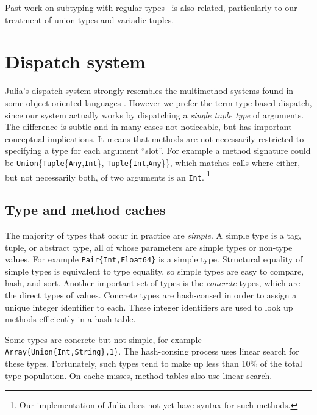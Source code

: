 Past work on subtyping with regular
types~\cite{hosoya2000regular, xtatic} is also related, particularly
to our treatment of union types and variadic tuples.


\section{Dispatch system}


Julia's dispatch system strongly resembles the multimethod systems
found in some object-oriented languages
\cite{closspec,closoverview,dylanlang,cecil,cecilspec,chambers2006diesel}.
However we prefer the term type-based dispatch, since our system
actually works by dispatching a \emph{single tuple type} of arguments.
The difference is subtle and in many cases not noticeable, but has
important conceptual implications.
It means that methods are not necessarily restricted to specifying
a type for each argument ``slot''.
For example a method signature could be
\texttt{Union}\{\texttt{Tuple}\{\texttt{Any},\texttt{Int}\}, \texttt{Tuple}\{\texttt{Int},\texttt{Any}\}\},
which matches calls where either, but not necessarily both, of two
arguments is an \texttt{Int}.
\footnote{Our implementation of Julia does not yet have syntax for such methods.}

\subsection{Type and method caches}

The majority of types that occur in practice are \emph{simple}.
A simple type is a tag, tuple, or abstract type, all of whose parameters
are simple types or non-type values.
For example \texttt{Pair\{Int,Float64\}} is a simple type.
Structural equality of simple types is equivalent to type equality,
so simple types are easy to compare, hash, and sort.
Another important set of types is the \emph{concrete} types, which
are the direct types of values.
Concrete types are hash-consed in order to assign a unique integer
identifier to each.
These integer identifiers are used to look up methods efficiently
in a hash table.

Some types are concrete but not simple, for example
\texttt{Array\{Union\{Int,String\},1\}}.
The hash-consing process uses linear search for these types.
Fortunately, such types tend to make up less than 10\% of the total
type population.
On cache misses, method tables also use linear search.

